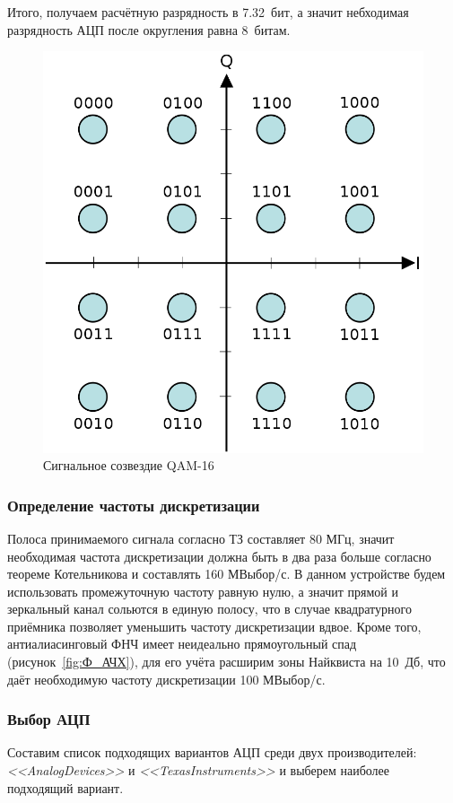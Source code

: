 \documentclass[utf8x, 14pt, oneside, a4paper]{article}
\begin{document}
				Итого, получаем расчётную разрядность в 7.32~бит, а значит небходимая разрядность АЦП после округления равна 8~битам.
				\begin{figure}[h!]
					\centering
					\includegraphics[width=0.7\linewidth]{"СозвездиеQAM16"}
					\caption{Сигнальное созвездие QAM-16}
					\label{fig:созвездиеQAM16}
				\end{figure}  
				
			\subsubsection{Определение частоты дискретизации}
				Полоса принимаемого сигнала согласно ТЗ составляет 80 МГц, значит необходимая частота дискретизации должна быть в два раза больше согласно теореме Котельникова и составлять 160 МВыбор/с. В данном устройстве будем использовать промежуточную частоту равную нулю, а значит прямой и зеркальный канал сольются в единую полосу, что в случае квадратурного приёмника позволяет уменьшить частоту дискретизации вдвое. Кроме того, антиалиасинговый ФНЧ имеет неидеально прямоугольный спад (рисунок~\ref{fig:Ф_АЧХ}), для его учёта расширим зоны Найквиста на 10~Дб, что даёт необходимую частоту дискретизации 100 МВыбор/с.
				
			\subsubsection{Выбор АЦП}
				Составим список подходящих вариантов АЦП среди двух производителей: \textit{<<AnalogDevices>>} и \textit{<<TexasInstruments>>} и выберем наиболее подходящий вариант.
				
\end{document}
